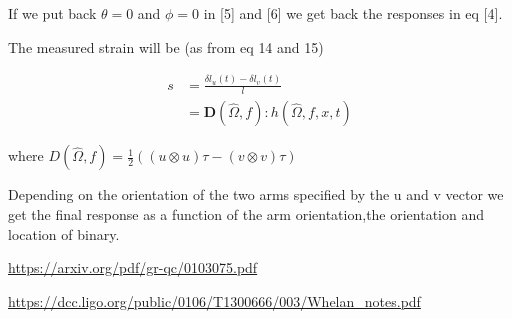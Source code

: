 \documentclass[10pt,a4paper]{article}
\begin{document}
If we put back $\theta=0$ and $\phi=0$ in [5] and [6] we get back the responses in eq [4].

The measured strain will be (as from eq 14 and 15)

\begin{align}
s&=\frac{\delta l_u (t) - \delta l_v (t)}{l}\\
&=\textbf{D}(\hat{\Omega},f) : h(\hat{\Omega},f,x,t)
\end{align}

where $D(\hat{\Omega},f) = \frac{1}{2}\left((u \otimes u) \tau - (v \otimes v) \tau \right)$

Depending on the orientation of the two arms specified by the u and v vector we get the final response as a function of the arm orientation,the orientation and location of binary.
\begin{thebibliography}{9}

				\url{https://arxiv.org/pdf/gr-qc/0103075.pdf}

 \url{https://dcc.ligo.org/public/0106/T1300666/003/Whelan_notes.pdf}
\end{thebibliography}
\end{document}
